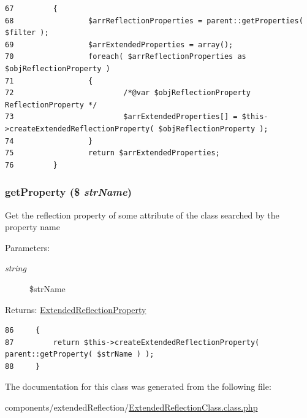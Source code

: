 \begin{Code}\begin{verbatim}67         {
68                 $arrReflectionProperties = parent::getProperties( $filter );
69                 $arrExtendedProperties = array();
70                 foreach( $arrReflectionProperties as $objReflectionProperty )
71                 {
72                         /*@var $objReflectionProperty ReflectionProperty */
73                         $arrExtendedProperties[] = $this->createExtendedReflectionProperty( $objReflectionProperty );
74                 }
75                 return $arrExtendedProperties;
76         }
\end{verbatim}
\end{Code}


\hypertarget{class_extended_reflection_class_59a1bf8713bdaa9c0ada05f3bcff969a}{
\subsubsection[{getProperty}]{\setlength{\rightskip}{0pt plus 5cm}getProperty (\$ {\em strName})}}
\label{class_extended_reflection_class_59a1bf8713bdaa9c0ada05f3bcff969a}


Get the reflection property of some attribute of the class searched by the property name

\begin{Desc}
\item[Parameters:]
\begin{description}
\item[{\em string}]\$strName \end{description}
\end{Desc}
\begin{Desc}
\item[Returns:]\hyperlink{class_extended_reflection_property}{ExtendedReflectionProperty} \end{Desc}


\begin{Code}\begin{verbatim}86     {
87         return $this->createExtendedReflectionProperty( parent::getProperty( $strName ) );
88     }
\end{verbatim}
\end{Code}




The documentation for this class was generated from the following file:\begin{CompactItemize}
\item 
components/extendedReflection/\hyperlink{_extended_reflection_class_8class_8php}{ExtendedReflectionClass.class.php}\end{CompactItemize}
